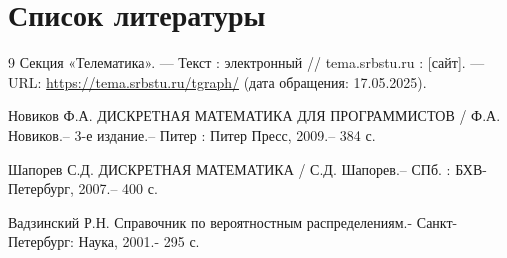 \section*{Список литературы}

\begin{thebibliography}{9}
	 Секция «Телематика». — Текст : электронный // tema.srbstu.ru : [сайт]. — URL: \url{https://tema.srbstu.ru/tgraph/} (дата обращения: 17.05.2025).
	
	 Новиков Ф.А. ДИСКРЕТНАЯ МАТЕМАТИКА ДЛЯ ПРОГРАММИСТОВ / Ф.А. Новиков.– 3-е издание.– Питер : Питер Пресс, 2009.– 384 с.
	
	 Шапорев С.Д. ДИСКРЕТНАЯ МАТЕМАТИКА / С.Д. Шапорев.– СПб. : БХВ-Петербург, 2007.– 400 с.
	
	 Вадзинский Р.Н. Справочник по вероятностным распределениям.- Санкт-Петербург: Наука, 2001.- 295 с.
\end{thebibliography}